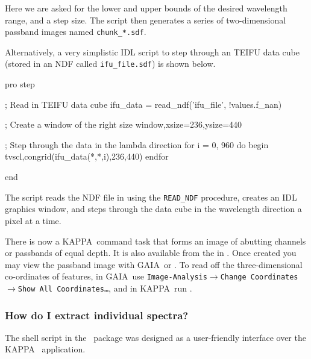\documentclass[twoside,11pt]{starlink}
\providecommand{\DATACUBE}{{\footnotesize DATACUBE}\normalsize}
\providecommand{\DATACUBEref}{\xref{\DATACUBE}{sun237}{}}
\providecommand{\GAIA}{{\footnotesize GAIA}\normalsize}
\providecommand{\GAIAref}{\xref{\GAIA}{sun214}{}}
\providecommand{\KAPPA}{{\footnotesize KAPPA}\normalsize}
\begin{document}
Here we are asked for the lower and upper bounds of the desired
wavelength range, and a step size.  The script then generates a series
of  two-dimensional passband images named \verb+chunk_*.sdf+.

Alternatively, a very simplistic IDL script to step through an TEIFU
data cube (stored in an NDF called \texttt{ifu\_file.sdf}) is shown below.

\begin{small}
\begin{terminalv}
pro step

   ; Read in TEIFU data cube
   ifu_data = read_ndf('ifu_file', !values.f_nan)

   ; Create a window of the right size
   window,xsize=236,ysize=440

   ; Step through the data in the lambda direction
   for i = 0, 960 do begin
      tvscl,congrid(ifu_data(*,*,i),236,440)
   endfor

end
\end{terminalv}
\end{small}

The script reads the NDF file in using the \texttt{READ\_NDF} procedure,
creates an IDL graphics window, and steps through the data cube in the
wavelength direction a pixel at a time.

There is now a \KAPPA\ command  task
that forms an image of abutting channels or passbands of equal depth.
It is also available from the 
in \GAIAref.  Once created you may view the passband image with \GAIA\ or
.  To read off the
three-dimensional co-ordinates of features, in \GAIA\ use
\texttt{Image-Analysis$\rightarrow$Change Coordinates$\rightarrow$Show
All Coordinates\ldots}, and in \KAPPA\ run .

\subsubsection{How do I extract individual spectra?}

The  shell script in the
\DATACUBEref\ package was designed as a user-friendly interface over
the \KAPPA\  application.

\end{document}

